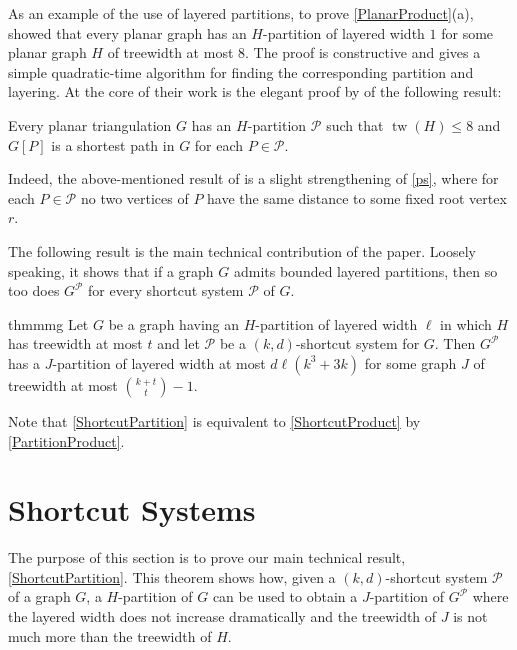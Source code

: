 \documentclass{patmorin}
\DeclareMathOperator{\tw}{tw}
\newcommand{\PP}{\mathcal{P}}
\renewcommand{\leq}{\leqslant}
\begin{document}
As an example of the use of layered partitions, to prove \cref{PlanarProduct}(a), 
\citet{DJMMUW20} showed that every planar graph has an $H$-partition of layered width $1$ for some planar graph $H$ of treewidth at most $8$. The proof is constructive and gives a simple quadratic-time algorithm for finding the corresponding partition and layering.
At the core of their work is the elegant proof by \citet{PS21} of the following result:

\begin{thm}[\citep{PS21}]
\label{ps}
Every planar triangulation $G$ has an $H$-partition $\mathcal{P}$
such that $\tw(H)\leq 8$ and $G[P]$ is a shortest path in $G$ for each $P\in\mathcal{P}$.
\end{thm}

Indeed, the above-mentioned result of \citet{DJMMUW20} is a slight strengthening of \cref{ps}, where for each $P\in\mathcal{P}$ no two vertices of $P$ have the same distance to some fixed root vertex $r$.

The following result is the main technical contribution of the paper. Loosely speaking, it shows that if a graph $G$ admits bounded layered partitions, then so too does $G^\PP$ for every shortcut system $\PP$ of $G$.

\begin{restatable}{thm}{mmg}
	\label{ShortcutPartition}
	Let $G$ be a graph having an $H$-partition of layered width $\ell$ in which $H$ has treewidth at most $t$ and let $\PP$ be a $(k,d)$-shortcut system for $G$.  Then $G^\PP$ has a $J$-partition of layered width at most $d\ell(k^3+3k)$ for some graph $J$ of treewidth at most $\binom{k+t}{t}-1$.
\end{restatable}

Note that \cref{ShortcutPartition} is equivalent to \cref{ShortcutProduct} by \cref{PartitionProduct}.



\section{Shortcut Systems}
\label{Structure}

The purpose of this section is to prove our main technical result, \cref{ShortcutPartition}. This theorem shows how, given a $(k,d)$-shortcut system $\mathcal{P}$ of a graph $G$, a $H$-partition of $G$ can be used to obtain a $J$-partition of $G^{\mathcal{P}}$ where the layered width  does not increase dramatically and the treewidth of $J$ is not much more than the treewidth of $H$.  
\end{document}
